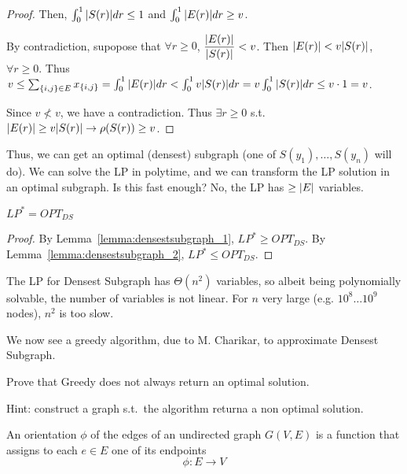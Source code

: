 \begin{proof}
        Then, $\int_0^1 \vert S(r) \vert dr \leq 1$ and $\int_0^1 \vert E(r) \vert dr \geq v$.

        By contradiction, supopose that $\forall r \geq 0$, $\dfrac{\vert E(r) \vert}{\vert S(r) \vert} < v$.
        Then $\vert E(r) \vert < v \vert S(r) \vert$, $\forall r \geq 0$.
        Thus $v \leq \sum_{\{i,j\} \in E} x_{\{i,j\}} = \int_0^1 \vert E(r) \vert dr < \int_0^1 v \vert S(r) \vert dr = v \int_0^1 \vert S(r) \vert dr \leq v \cdot 1 = v$.

        Since $v \not< v$, we have a contradiction.
        Thus $\exists r \geq 0$ s.t. $\vert E(r) \vert \geq v \vert S(r) \vert \rightarrow \rho(S(r)) \geq v$.
    \end{proof}

    Thus, we can get an optimal (densest) subgraph (one of $S(y_1), \dots, S(y_n)$ will do).
    We can solve the LP in polytime, and we can transform the LP solution in an optimal subgraph.
    Is this fast enough? No, the LP has $\geq \vert E \vert$ variables.

    \begin{corollary}
        $LP^* = OPT_{DS}$
    \end{corollary}

    \begin{proof}
        By Lemma~\ref{lemma:densestsubgraph_1}, $LP^* \geq OPT_{DS}$.
        By Lemma~\ref{lemma:densestsubgraph_2}, $LP^* \leq OPT_{DS}$.
    \end{proof}

    The LP for Densest Subgraph has $\Theta(n^2)$ variables, so albeit being polynomially solvable, the number of variables is not linear.
    For $n$ very large (e.g. $10^8 \dots 10^9$ nodes), $n^2$ is too slow.

    We now see a greedy algorithm, due to M. Charikar, to approximate Densest Subgraph.

    

    \begin{exercise}
        Prove that Greedy does not always return an optimal solution.

        Hint: construct a graph s.t.~the algorithm returna a non optimal solution.
    \end{exercise}

    \begin{definition}[Orientation]
        An orientation $\phi$ of the edges of an undirected graph $G(V,E)$ is a function that assigns to each $e \in E$ one of its endpoints
        \[ \phi : E \rightarrow V \]
    \end{definition}
    
